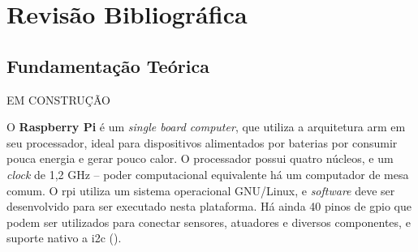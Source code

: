 \section{Revisão Bibliográfica}
\label{sec:revbib}

\subsection{Fundamentação Teórica}


EM CONSTRUÇÃO






O \textbf{Raspberry Pi} é um \emph{single board computer}, que utiliza a arquitetura \acrshort{arm} em seu processador, ideal para dispositivos alimentados por baterias por consumir pouca energia e gerar pouco calor. O processador possui quatro núcleos, e um \emph{clock} de 1,2 GHz -- poder computacional equivalente há um computador de mesa comum. O \acrshort{rpi} utiliza um sistema operacional GNU/Linux, e \emph{software} deve ser desenvolvido para ser executado nesta plataforma. Há ainda 40 pinos de \acrshort{gpio} que podem ser utilizados para conectar sensores, atuadores e diversos componentes, e suporte nativo a \acrshort{i2c} (\cite{upton2014raspberry}).

